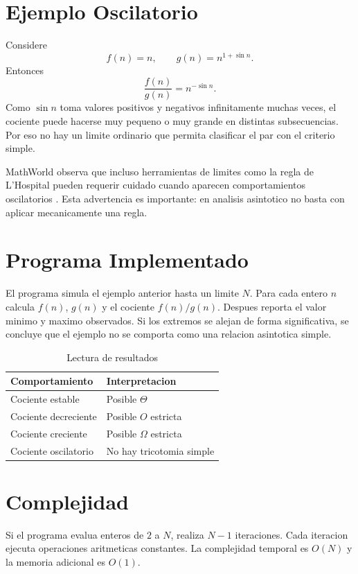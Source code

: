 \documentclass[conference]{IEEEtran}
\begin{document}
\section{Ejemplo Oscilatorio}
Considere
\begin{equation}
f(n)=n,\qquad g(n)=n^{1+\sin n}.
\end{equation}
Entonces
\begin{equation}
\frac{f(n)}{g(n)}=n^{-\sin n}.
\end{equation}
Como $\sin n$ toma valores positivos y negativos infinitamente muchas veces,
el cociente puede hacerse muy pequeno o muy grande en distintas subsecuencias.
Por eso no hay un limite ordinario que permita clasificar el par con el
criterio simple.

MathWorld observa que incluso herramientas de limites como la regla de
L'Hospital pueden requerir cuidado cuando aparecen comportamientos
oscilatorios \cite{mathworld_lhopital}. Esta advertencia es importante:
en analisis asintotico no basta con aplicar mecanicamente una regla.

\section{Programa Implementado}
El programa simula el ejemplo anterior hasta un limite $N$. Para cada entero
$n$ calcula $f(n)$, $g(n)$ y el cociente $f(n)/g(n)$. Despues reporta el valor
minimo y maximo observados. Si los extremos se alejan de forma significativa,
se concluye que el ejemplo no se comporta como una relacion asintotica simple.

\begin{table}[htbp]
\caption{Lectura de resultados}
\centering
\begin{tabular}{ll}
\toprule
Comportamiento & Interpretacion \\
\midrule
Cociente estable & Posible $\Theta$ \\
Cociente decreciente & Posible $O$ estricta \\
Cociente creciente & Posible $\Omega$ estricta \\
Cociente oscilatorio & No hay tricotomia simple \\
\bottomrule
\end{tabular}
\end{table}

\section{Complejidad}
Si el programa evalua enteros de $2$ a $N$, realiza $N-1$ iteraciones. Cada
iteracion ejecuta operaciones aritmeticas constantes. La complejidad temporal
es $O(N)$ y la memoria adicional es $O(1)$.
\end{document}
